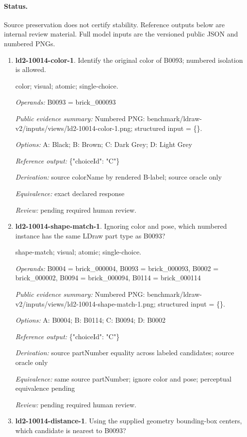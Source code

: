 \paragraph{Status.}Source preservation does not certify stability. Reference outputs below are internal review material. Full model inputs are the versioned public JSON and numbered PNGs.
\begin{enumerate}
\item \textbf{ld2-10014-color-1}. Identify the original color of B0093; numbered isolation is allowed.
\par{\small color; visual; atomic; single-choice.\par\textit{Operands:} B0093 = brick\_000093\par\textit{Public evidence summary:} Numbered PNG: benchmark/ldraw-v2/inputs/views/ld2-10014-color-1.png; structured input = \{\}.\par\textit{Options:} A: Black; B: Brown; C: Dark Grey; D: Light Grey\par\textit{Reference output:} \{"choiceId": "C"\}\par\textit{Derivation:} source colorName by rendered B-label; source oracle only\par\textit{Equivalence:} exact declared response\par\textit{Review:} pending required human review.}
\item \textbf{ld2-10014-shape-match-1}. Ignoring color and pose, which numbered instance has the same LDraw part type as B0093?
\par{\small shape-match; visual; atomic; single-choice.\par\textit{Operands:} B0004 = brick\_000004, B0093 = brick\_000093, B0002 = brick\_000002, B0094 = brick\_000094, B0114 = brick\_000114\par\textit{Public evidence summary:} Numbered PNG: benchmark/ldraw-v2/inputs/views/ld2-10014-shape-match-1.png; structured input = \{\}.\par\textit{Options:} A: B0004; B: B0114; C: B0094; D: B0002\par\textit{Reference output:} \{"choiceId": "C"\}\par\textit{Derivation:} source partNumber equality across labeled candidates; source oracle only\par\textit{Equivalence:} same source partNumber; ignore color and pose; perceptual equivalence pending\par\textit{Review:} pending required human review.}
\item \textbf{ld2-10014-distance-1}. Using the supplied geometry bounding-box centers, which candidate is nearest to B0093?

\end{enumerate}
